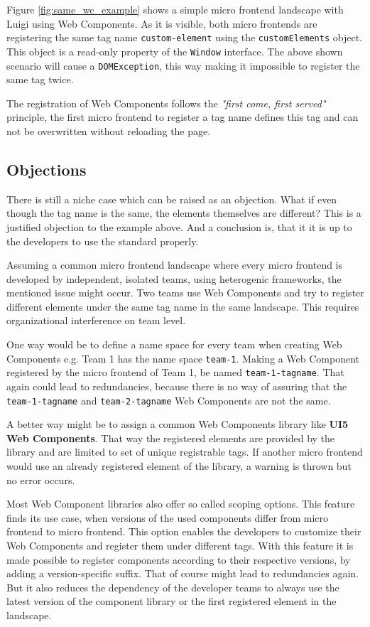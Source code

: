 Figure \ref{fig:same_wc_example} shows a simple micro frontend landscape with Luigi using Web Components. As it is visible, both micro frontends are registering the same tag name \texttt{custom-element} using the \texttt{customElements} object. This object is a read-only property of the \texttt{Window} interface.
The above shown scenario will cause a  \texttt{DOMException}, this way making it impossible to register the same tag twice.

The registration of Web Components follows the \textit{"first come, first served"} principle, the first micro frontend to register a tag name defines this tag and can not be overwritten without reloading the page.\cite{mdn_web_docs_define}

\subsection{Objections}

There is still a niche case which can be raised as an objection. What if even though the tag name is the same, the elements themselves are different? This is a justified objection to the example above. And a conclusion is, that it it is up to the developers to use the standard properly.

Assuming a common micro frontend landscape where every micro frontend is developed by independent, isolated teams, using heterogenic frameworks, the mentioned issue might occur. Two teams use Web Components and try to register different elements under the same tag name in the same landscape. This requires organizational interference on team level.

One way would be to define a name space for every team when creating Web Components e.g. Team 1 has the name space \texttt{team-1}. Making a Web Component registered by the micro frontend of Team 1, be named \texttt{team-1-tagname}. That again could lead to redundancies, because there is no way of assuring that the \texttt{team-1-tagname} and \texttt{team-2-tagname} Web Components are not the same.\cite{wc_best_practices}

A better way might be to assign a common Web Components library like \textbf{UI5 Web Components}. That way the registered elements are provided by the library and are limited to set of unique registrable tags. If another micro frontend would use an already registered element of the library, a warning is thrown but no error occurs.

Most Web Component libraries also offer so called scoping options. This feature finds its use case, when versions of the used components differ from micro frontend to micro frontend. This option enables the developers to customize their Web Components and register them under different tags. With this feature it is made possible to register components according to their respective versions, by adding a version-specific suffix. That of course might lead to redundancies again. But it also reduces the dependency of the developer teams to always use the latest version of the component library or the first registered element in the landscape. \cite{ui5_webcomponents_scoping} \cite{openwc_scoping}

